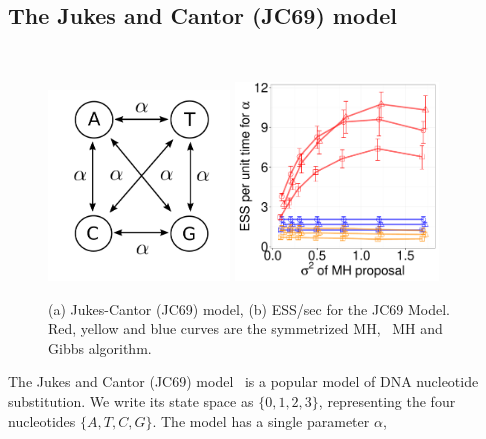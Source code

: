 {%
  \subsection{The Jukes and Cantor (JC69) model}~
  \begin{figure}%
  \begin{minipage}[!hp]{0.99\linewidth}
    \includegraphics[width=0.43\textwidth, angle=0]{figs/jc_model.pdf}
    \includegraphics[width=0.48\textwidth, angle=0]{figs/jc.pdf}
  \end{minipage}
  \caption{(a) Jukes-Cantor (JC69) model, (b)
    ESS/sec for the JC69 Model. Red, yellow and blue curves are the 
      symmetrized MH, \naive\ MH and Gibbs algorithm. }
     \label{fig:ESS_JC}
  \end{figure}
  The Jukes and Cantor (JC69) model~\citep{jukescantor69} is a popular model of DNA nucleotide
  substitution.  We write its state space as $\{0, 1, 2, 3\}$, representing the 
  four nucleotides $\{A, T, C, G\}$.  The model has a single parameter $\alpha$, 
}
